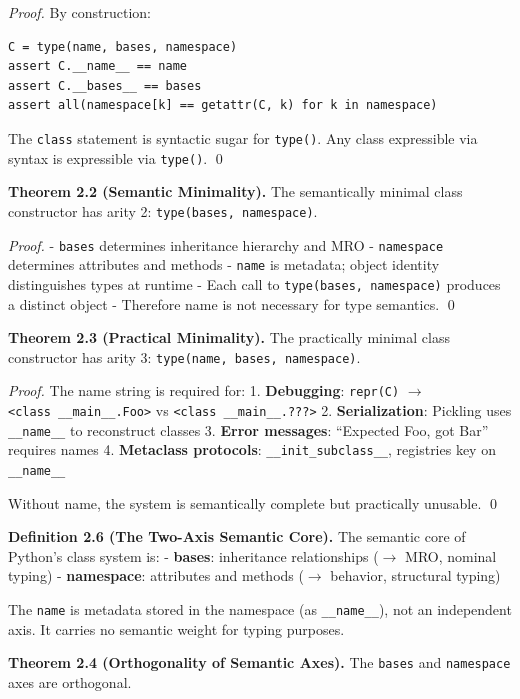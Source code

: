 \emph{Proof.} By construction:

\begin{verbatim}
C = type(name, bases, namespace)
assert C.__name__ == name
assert C.__bases__ == bases
assert all(namespace[k] == getattr(C, k) for k in namespace)
\end{verbatim}

The \texttt{class} statement is syntactic sugar for \texttt{type()}. Any
class expressible via syntax is expressible via \texttt{type()}.
\qed

\textbf{Theorem 2.2 (Semantic Minimality).} The semantically minimal
class constructor has arity 2: \texttt{type(bases,\ namespace)}.

\emph{Proof.} - \texttt{bases} determines inheritance hierarchy and MRO
- \texttt{namespace} determines attributes and methods - \texttt{name}
is metadata; object identity distinguishes types at runtime - Each call
to \texttt{type(bases,\ namespace)} produces a distinct object -
Therefore name is not necessary for type semantics. \qed

\textbf{Theorem 2.3 (Practical Minimality).} The practically minimal
class constructor has arity 3: \texttt{type(name,\ bases,\ namespace)}.

\emph{Proof.} The name string is required for: 1. \textbf{Debugging}:
\texttt{repr(C)} \(\rightarrow\)
\texttt{\textless{}class\ \textquotesingle{}\_\_main\_\_.Foo\textquotesingle{}\textgreater{}}
vs
\texttt{\textless{}class\ \textquotesingle{}\_\_main\_\_.???\textquotesingle{}\textgreater{}}
2. \textbf{Serialization}: Pickling uses \texttt{\_\_name\_\_} to
reconstruct classes 3. \textbf{Error messages}: ``Expected Foo, got
Bar'' requires names 4. \textbf{Metaclass protocols}:
\texttt{\_\_init\_subclass\_\_}, registries key on \texttt{\_\_name\_\_}

Without name, the system is semantically complete but practically
unusable. \qed

\textbf{Definition 2.6 (The Two-Axis Semantic Core).} The semantic core
of Python's class system is: - \textbf{bases}: inheritance relationships
(\(\rightarrow\) MRO, nominal typing) - \textbf{namespace}: attributes
and methods (\(\rightarrow\) behavior, structural typing)

The \texttt{name} is metadata stored in the namespace (as \texttt{\_\_name\_\_}),
not an independent axis. It carries no semantic weight for typing purposes.

\textbf{Theorem 2.4 (Orthogonality of Semantic Axes).} The
\texttt{bases} and \texttt{namespace} axes are orthogonal.

